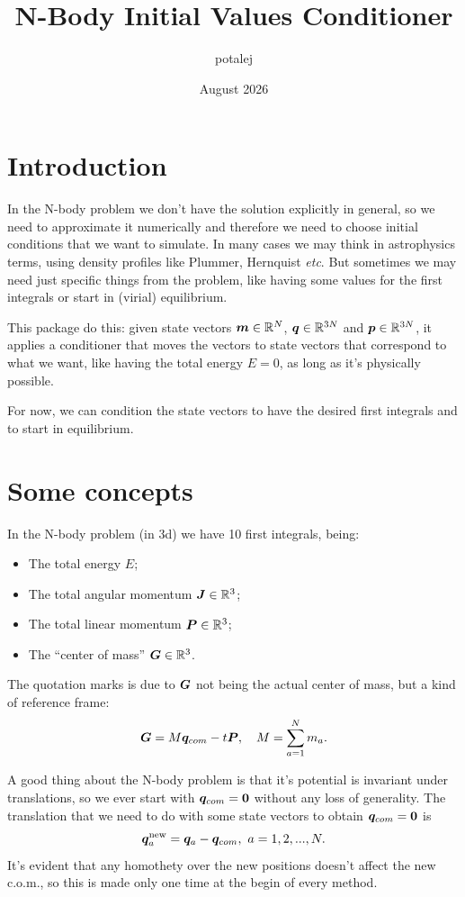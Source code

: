 \documentclass{article}
\title{N-Body Initial Values Conditioner}
\author{potalej}
\date{August 2026}
\begin{document}
\maketitle

\tableofcontents

\section{Introduction}

In the N-body problem we don't have the solution explicitly in general, so we need to approximate it numerically and therefore we need to choose initial conditions that we want to simulate. In many cases we may think in astrophysics terms, using density profiles like Plummer, Hernquist \textit{etc}. But sometimes we may need just specific things from the problem, like having some values for the first integrals or start in (virial) equilibrium.

This package do this: given state vectors $\bm m \in \mathbb{R}^N$, $\bm q \in \mathbb{R}^{3N}$ and $\bm p \in \mathbb{R}^{3N}$, it applies a conditioner that moves the vectors to state vectors that correspond to what we want, like having the total energy $E = 0$, as long as it's physically possible.

For now, we can condition the state vectors to have the desired first integrals and to start in equilibrium.


\section{Some concepts}
In the N-body problem (in 3d) we have 10 first integrals, being:
\begin{itemize}
    \item The total energy $E$;
    \item The total angular momentum $\bm J \in \mathbb{R}^3$;
    \item The total linear momentum $\bm P \in \mathbb{R}^3$;
    \item The ``center of mass'' $\bm G \in \mathbb{R}^3$.
\end{itemize}

The quotation marks is due to $\bm G$ not being the actual center of mass, but a kind of reference frame:
\begin{equation}
    \bm G = M \bm q_{com} - t \bm P,
    \quad
    M = \sum_{a=1}^N m_a.
\end{equation}

A good thing about the N-body problem is that it's potential is invariant under translations, so we ever start with $\bm q_{com} = \bm 0$ without any loss of generality. The translation that we need to do with some state vectors to obtain $\bm q_{com} = \bm 0$ is
\begin{equation}
    \bm q_a^{\text{new}} = \bm q_a - \bm q_{com}, \ a = 1, 2, ..., N.
\end{equation}
It's evident that any homothety over the new positions doesn't affect the new c.o.m., so this is made only one time at the begin of every method.
\end{document}
